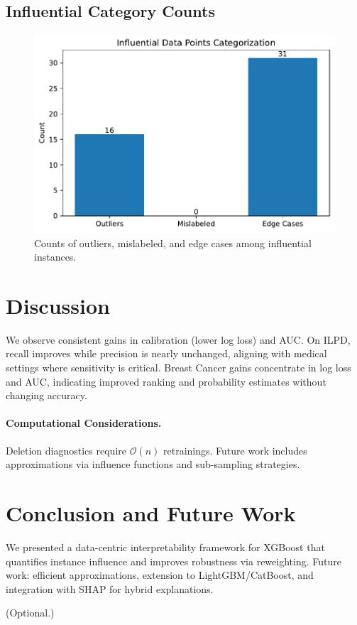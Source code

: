 \documentclass[sn-basic]{sn-jnl} %
\begin{document}
\subsection{Influential Category Counts}
\begin{figure}[H]
  \centering
  \includegraphics[width=.7\linewidth]{fig_category_counts.pdf}
  \caption{Counts of outliers, mislabeled, and edge cases among influential instances.}
  \label{fig:cats}
\end{figure}

\section{Discussion}
We observe consistent gains in calibration (lower log loss) and AUC. On ILPD, recall improves while precision is nearly unchanged, aligning with medical settings where sensitivity is critical. Breast Cancer gains concentrate in log loss and AUC, indicating improved ranking and probability estimates without changing accuracy.

\paragraph{Computational Considerations.} Deletion diagnostics require $\mathcal{O}(n)$ retrainings. Future work includes approximations via influence functions and sub-sampling strategies.

\section{Conclusion and Future Work}
We presented a data-centric interpretability framework for XGBoost that quantifies instance influence and improves robustness via reweighting. Future work: efficient approximations, extension to LightGBM/CatBoost, and integration with SHAP for hybrid explanations.

(Optional.)
\end{document}
